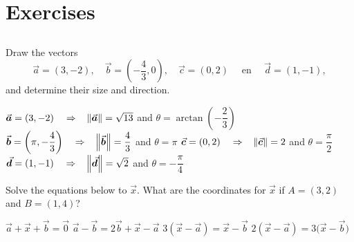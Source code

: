 \fi


\ifcourse
\newpage

\section{Exercises}

\renewcommand{\ExerciseListName}{Opgave}
\subsection*{}

\begin{Exercise}[difficulty = 1] Draw the vectors 
	\[\vec{a}=(3,-2),\quad \vec{b}=\left(-\dfrac{4}{3},0\right),\quad \vec{c}=(0,2)\quad \text{ en } \quad \vec{d}=(1,-1), \]
	and determine their size and direction.
\end{Exercise}

\begin{Answer}\phantom{}
	    \Question  $\vec{a}=(3,-2) \quad \Rightarrow \quad \norm{\vec a} = \sqrt{13}$ \quad and \quad $ \theta = \arctan\left( - \dfrac{2}{3} \right)$
	    \Question  $\vec{b}=\left(\pi, -\dfrac{4}{3}\right) \quad \Rightarrow \quad \norm{\vec b} = \dfrac{4}{3}$ \quad and \quad $ \theta = \pi$
	    \Question  $\vec{c}=(0,2) \quad \Rightarrow \quad \norm{\vec c} = 2$ \quad and \quad $ \theta = \dfrac{\pi}{2}$
	    \Question  $\vec{d}=(1,-1) \quad \Rightarrow \quad \norm{\vec d} = \sqrt{2}$ \quad and \quad $ \theta = - \dfrac{\pi}{4}$
\end{Answer}

\begin{Exercise} Solve the equations below to $\vec{x}$. What are the coordinates for $\vec{x}$ if $A=(3,2)$ and $B=(1,4)$? 
	\begin{multicols}{2}
	\Question[difficulty = 1] $\vec{a}+\vec{x}+\vec{b}=\vec{0}$
	\Question[difficulty = 1] $\vec{a}-\vec{b}=2\vec{b}+\vec{x}-\vec{a}$ 
	\Question[difficulty = 1] $3\left(\vec{x}-\vec{a}\right)=\vec{x}-\vec{b}$
	\Question[difficulty = 1] $2\left(\vec{x}-\vec{a}\right)=3\bigl(\vec{x}-\vec{b}\bigr)$
	\EndCurrentQuestion
	\end{multicols}

\end{Exercise}

